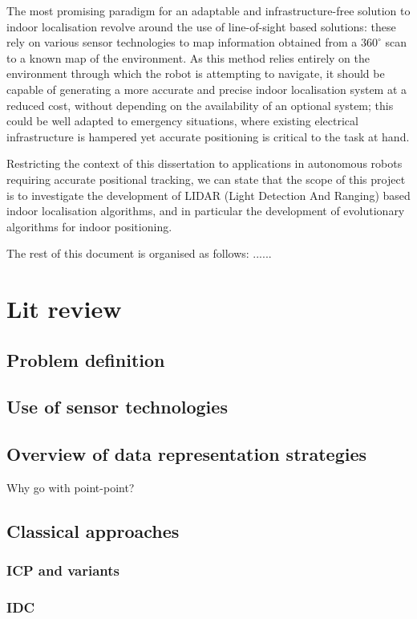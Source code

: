 \documentclass[authoryearcitations]{UoYCSproject}
\begin{document}
The most promising paradigm for an adaptable and infrastructure-free solution to indoor localisation revolve around the use of line-of-sight based solutions: these rely on various sensor technologies to map information obtained from a  $360^{\circ}$ scan to a known map of the environment. As this method relies entirely on the environment through which the robot is attempting to navigate, it should be capable of generating a more accurate and precise indoor localisation system at a reduced cost, without depending on the availability of an optional system; this could be well adapted to emergency situations, where existing electrical infrastructure is hampered yet accurate positioning is critical to the task at hand. 

Restricting the context of this dissertation to applications in autonomous robots requiring accurate positional tracking, we can state that the scope of this project is to investigate the development of LIDAR (Light Detection And Ranging) based indoor localisation algorithms, and in particular the development of evolutionary algorithms for indoor positioning.

The rest of this document is organised as follows: ...... 
\chapter{Lit review}

\section{Problem definition}

\section{Use of sensor technologies}
\section{Overview of data representation strategies}
Why go with point-point?
\section{Classical approaches}
\subsection{ICP and variants}
\subsection{IDC}
\end{document}
